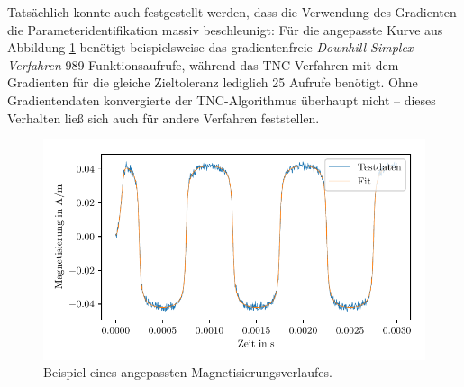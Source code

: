 \documentclass{scrartcl}
\begin{document}
Tatsächlich konnte auch festgestellt werden, dass die Verwendung des Gradienten die Parameteridentifikation massiv beschleunigt: Für die angepasste Kurve aus Abbildung \ref{fig:fit} benötigt beispielsweise das gradientenfreie \emph{Downhill-Simplex-Verfahren} \cite{neldermead} \num{989} Funktionsaufrufe, während das TNC-Verfahren mit dem Gradienten für die gleiche Zieltoleranz lediglich \num{25} Aufrufe benötigt. Ohne Gradientendaten konvergierte der TNC-Algorithmus überhaupt nicht -- dieses Verhalten ließ sich auch für andere Verfahren feststellen.
\begin{figure}
\caption{Beispiel eines angepassten Magnetisierungsverlaufes.}\label{fig:fit}
\includegraphics[width=\textwidth]{fit}
\end{figure}
\end{document}
